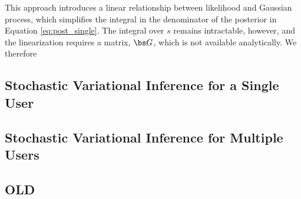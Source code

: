 This approach introduces a linear relationship between 
likelihood and Gaussian process, 
which simplifies the integral in the denominator of the posterior in Equation \ref{eq:post_single}.
The integral over $s$ remains intractable, however, and the linearization 
requires a matrix, $\bs G$, which is not available analytically. We therefore  

\subsection{Stochastic Variational Inference for a Single User}
\subsection{Stochastic Variational Inference for Multiple Users}
\subsection{OLD}


